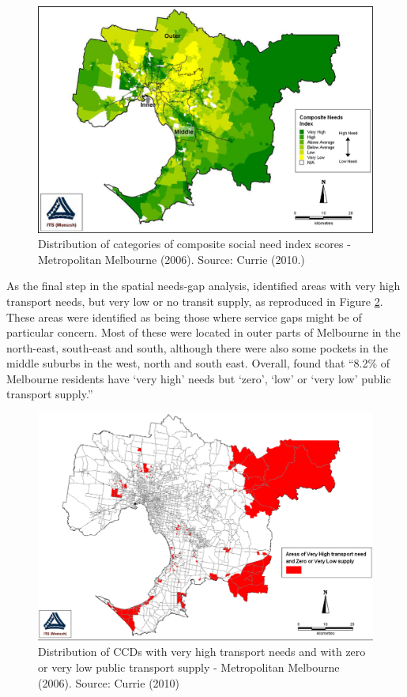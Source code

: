 \documentclass[preprint, 3p,
authoryear]{elsarticle} %
\begin{document}
\begin{figure}
\includegraphics[width=1\linewidth]{graphics/Currie2010Needs} \caption{Distribution of categories of composite social need index scores - Metropolitan Melbourne (2006). Source: Currie (2010.)}\label{fig:Currie_map_needs}
\end{figure}

As the final step in the spatial needs-gap analysis,
\citet{currie2010identifying} identified areas with very high transport
needs, but very low or no transit supply, as reproduced in Figure
\ref{fig:Currie_map_gap}. These areas were identified as being those
where service gaps might be of particular concern. Most of these were
located in outer parts of Melbourne in the north-east, south-east and
south, although there were also some pockets in the middle suburbs in
the west, north and south east. Overall, \citet{currie2010identifying}
found that ``8.2\% of Melbourne residents have `very high' needs but
`zero', `low' or `very low' public transport supply.''

\begin{figure}
\includegraphics[width=1\linewidth]{graphics/Currie2010gap} \caption{Distribution of CCDs with very high transport needs and with zero or very low public transport supply - Metropolitan Melbourne (2006). Source: Currie (2010)}\label{fig:Currie_map_gap}
\end{figure}
\end{document}
